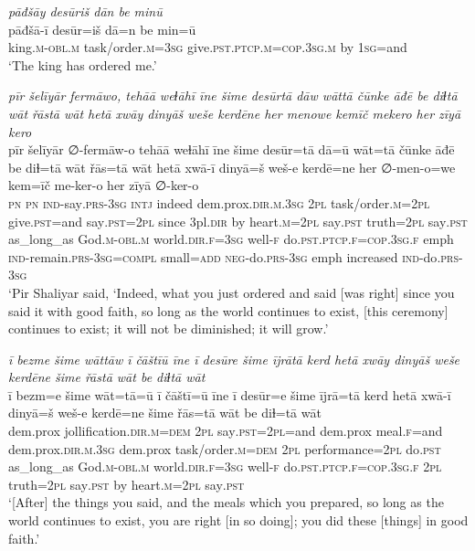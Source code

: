 \ea \label{ŽP.209}
\textit{pāđšāy desūriš dān be minū} \\ 
\gll pāđšā-ī desūr=iš dā=n be min=ū \\ 
 king\textsc{.m}\textsc{-obl}\textsc{.m} task/order\textsc{.m}\textsc{=3sg} give\textsc{.pst}\textsc{.ptcp}\textsc{.m}\textsc{=cop}\textsc{.3sg}\textsc{.m} by \textsc{1sg}=and \\ 
\glt `The king has ordered me.'
\z 
 
\ea \label{ŽP.243}
\textit{pīr šelīyār fermāwo, tehāā weɫāhī īne šime desūrtā dāw wāttā čūnke āđē be diɫtā wāt řāstā wāt hetā xwāy dinyāš weše kerdēne her menowe kemīč mekero her zīyā kero} \\ 
\gll pīr šelīyār ∅-fermāw-o tehāā weɫāhī īne šime desūr=tā dā=ū wāt=tā čūnke āđē be diɫ=tā wāt řās=tā wāt hetā xwā-ī dinyā=š weš-e kerdē=ne her ∅-men-o=we kem=īč me-ker-o her zīyā ∅-ker-o \\ 
 \textsc{pn} \textsc{pn} \textsc{ind-}say\textsc{.prs}\textsc{-3sg} \textsc{intj} indeed dem.prox\textsc{.dir}\textsc{.m}\textsc{.3sg} \textsc{2pl} task/order\textsc{.m}=\textsc{2pl} give\textsc{.pst}=and say\textsc{.pst}=\textsc{2pl} since 3pl\textsc{.dir} by heart\textsc{.m}=\textsc{2pl} say\textsc{.pst} truth=\textsc{2pl} say\textsc{.pst} as\_long\_as God\textsc{.m}\textsc{-obl}\textsc{.m} world\textsc{.dir}\textsc{.f}\textsc{=3sg} well\textsc{-f} do\textsc{.pst}\textsc{.ptcp}\textsc{.f}\textsc{=cop}\textsc{.3sg}\textsc{.f} emph \textsc{ind-}remain\textsc{.prs}\textsc{-3sg}\textsc{=compl} small\textsc{=add} \textsc{neg-}do\textsc{.prs}\textsc{-3sg} emph increased \textsc{ind-}do\textsc{.prs}\textsc{-3sg} \\ 
\glt `Pir Shaliyar said, ‘Indeed, what you just ordered and said [was right] since you said it with good faith, so long as the world continues to exist, [this ceremony] continues to exist; it will not be diminished; it will grow.'
\z 
 
\ea \label{ŽP.244}
\textit{ī bezme šime wāttāw ī čāštīū īne ī desūre šime ījrātā kerd hetā xwāy dinyāš weše kerdēne šime řāstā wāt be diɫtā wāt} \\ 
\gll ī bezm=e šime wāt=tā=ū ī čāštī=ū īne ī desūr=e šime ījrā=tā kerd hetā xwā-ī dinyā=š weš-e kerdē=ne šime řās=tā wāt be diɫ=tā wāt \\ 
 dem.prox jollification\textsc{.dir}\textsc{.m}\textsc{=dem} \textsc{2pl} say\textsc{.pst}=\textsc{2pl}=and dem.prox meal\textsc{.f}=and dem.prox\textsc{.dir}\textsc{.m}\textsc{.3sg} dem.prox task/order\textsc{.m}\textsc{=dem} \textsc{2pl} performance=\textsc{2pl} do\textsc{.pst} as\_long\_as God\textsc{.m}\textsc{-obl}\textsc{.m} world\textsc{.dir}\textsc{.f}\textsc{=3sg} well\textsc{-f} do\textsc{.pst}\textsc{.ptcp}\textsc{.f}\textsc{=cop}\textsc{.3sg}\textsc{.f} \textsc{2pl} truth=\textsc{2pl} say\textsc{.pst} by heart\textsc{.m}=\textsc{2pl} say\textsc{.pst} \\ 
\glt `[After] the things you said, and the meals which you prepared, so long as the world continues to exist, you are right [in so doing]; you did these [things] in good faith.'
\z 
 
